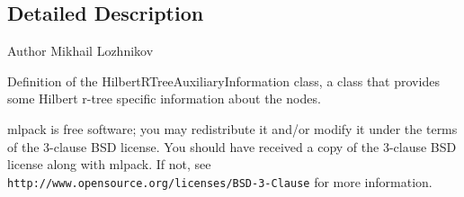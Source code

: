 \subsection{Detailed Description}
\begin{DoxyAuthor}{Author}
Mikhail Lozhnikov
\end{DoxyAuthor}
Definition of the Hilbert\+R\+Tree\+Auxiliary\+Information class, a class that provides some Hilbert r-\/tree specific information about the nodes.

mlpack is free software; you may redistribute it and/or modify it under the terms of the 3-\/clause B\+SD license. You should have received a copy of the 3-\/clause B\+SD license along with mlpack. If not, see {\tt http\+://www.\+opensource.\+org/licenses/\+B\+S\+D-\/3-\/\+Clause} for more information. 
